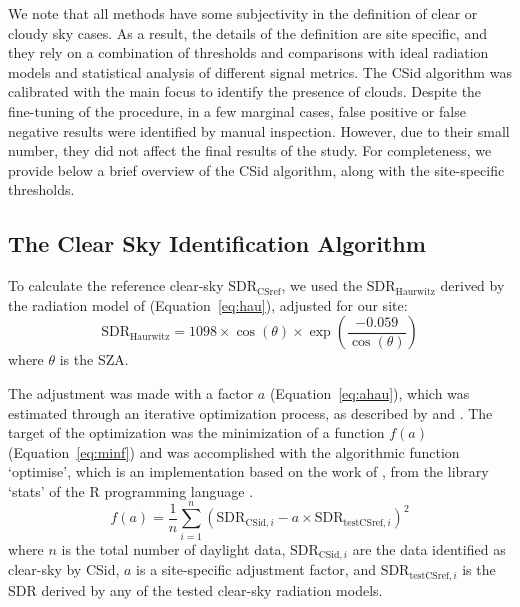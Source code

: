 \documentclass[applsci,article,accept,moreauthors,pdftex]{Definitions/mdpi}
\begin{document}
We note that all methods have some subjectivity in the definition of
clear or cloudy sky cases. As a result, the details of the definition
are site specific, and they rely on a combination of thresholds and
comparisons with ideal radiation models and statistical analysis of
different signal metrics. The CSid algorithm was calibrated with the
main focus to identify the presence of clouds. Despite the fine-tuning
of the procedure, in a few marginal cases, false positive or false
negative results were identified by manual inspection. However, due to
their small number, they did not affect the final results of the study.
For completeness, we provide below a brief overview of the CSid
algorithm, along with the site-specific thresholds.

\hypertarget{CDIDalgorithm}{%
\subsection{The Clear Sky Identification
Algorithm}\label{CDIDalgorithm}}

To calculate the reference clear-sky \(\text{SDR}_\text{CSref}\), we used
the \(\text{SDR}_\text{Haurwitz}\) derived by the radiation model of
\citet{Haurwitz1945} (Equation~\eqref{eq:hau}), adjusted for our site:
\begin{equation}
\text{SDR}_\text{Haurwitz} = 1098 \times \cos(\theta) \times \exp \left( \frac{ - 0.059}{\cos(\theta)} \right) \label{eq:hau}
\end{equation} where \(\theta\) is the SZA.

The adjustment was made with a factor \(a\) (Equation~\eqref{eq:ahau}), which
was estimated through an iterative optimization process, as described by
\citet{Long2000} and \citet{Reno2016}. The target of the optimization
was the minimization of a function \(f(a)\) (Equation~\eqref{eq:minf}) and was
accomplished with the algorithmic function `optimise', which is an
implementation based on the work of \citet{Brent1973}, from the library
`stats' of the R programming language \citep{RCT2023}.
\begin{equation}
f(a) = \frac{1}{n}\sum_{i=1}^{n} ( \text{SDR}_{\text{CSid},i} - a \times \text{SDR}_{\text{testCSref},i} )^2 \label{eq:minf}
\end{equation} where \(n\) is the total number of daylight data,
\(\text{SDR}_{\text{CSid},i}\) are the data identified as clear-sky by
CSid, \(a\) is a site-specific adjustment factor, and
\(\text{SDR}_{\text{testCSref},i}\) is the SDR derived by any of the
tested clear-sky radiation models.
\end{document}

